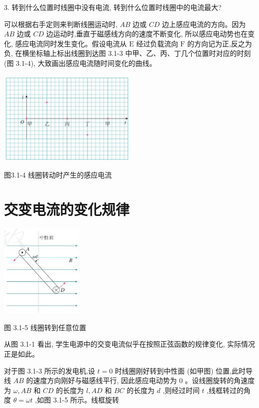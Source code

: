 \documentclass[10pt]{article}
\begin{document}
3. 转到什么位置时线圈中没有电流, 转到什么位置时线圈中的电流最大?

可以根据右手定则来判断线圈运动时, \({AB}\) 边或 \({CD}\) 边上感应电流的方向。因为 \({AB}\) 边或 \({CD}\) 边运动时,垂直于磁感线方向的速度不断变化, 所以感应电动势也在变化, 感应电流同时发生变化。假设电流从 \(\mathrm{E}\) 经过负载流向 \(\mathrm{F}\) 的方向记为正,反之为负, 在横坐标轴上标出线圈到达图 3.1-3 中甲、乙、丙、丁几个位置时对应的时刻 (图 3.1-4), 大致画出感应电流随时间变化的曲线。

\begin{center}
\includegraphics[max width=0.5\textwidth]{images/01910e72-c5b7-7ed5-a6d4-fb3a5faefc32_56_742029.jpg}
\end{center}

图3.1-4 线圈转动时产生的感应电流

\section*{交变电流的变化规律}

\begin{center}
\includegraphics[max width=0.3\textwidth]{images/01910e72-c5b7-7ed5-a6d4-fb3a5faefc32_56_857627.jpg}
\end{center}

图 3.1-5 线圈转到任意位置

从图 3.1-1 看出, 学生电源中的交变电流似乎在按照正弦函数的规律变化, 实际情况正是如此。

对于图 3.1-3 所示的发电机,设 \(t = 0\) 时线圈刚好转到中性面 (如甲图) 位置,此时导线 \({AB}\) 的速度方向刚好与磁感线平行, 因此感应电动势为 0 。设线圈旋转的角速度为 \(\omega ,{AB}\) 和 \({CD}\) 的长度为 \(l,{AD}\) 和 \({BC}\) 的长度为 \(d\) ,则经过时间 \(t\) ,线框转过的角度 \(\theta = {\omega t}\) ,如图 3.1-5 所示。线框旋转
\end{document}
